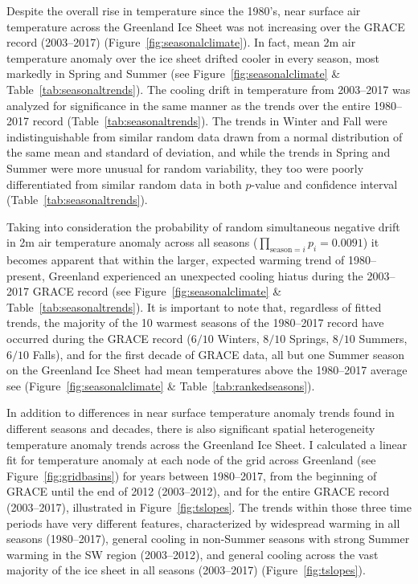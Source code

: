 \documentclass[11pt]{report}
\begin{document}


Despite the overall rise in temperature since the 1980's, near surface air temperature across the Greenland Ice Sheet was not increasing over the GRACE record (2003--2017) (Figure~\ref{fig:seasonalclimate}). In fact, mean 2m air temperature anomaly over the ice sheet drifted cooler in every season, most markedly in Spring and Summer (see Figure~\ref{fig:seasonalclimate} \& Table~\ref{tab:seasonaltrends}). The cooling drift in temperature from 2003--2017 was analyzed for significance in the same manner as the trends over the entire 1980--2017 record (Table~\ref{tab:seasonaltrends}). The trends in Winter and Fall were indistinguishable from similar random data drawn from a normal distribution of the same mean and standard of deviation, and while the trends in Spring and Summer were more unusual for random variability, they too were poorly differentiated from similar random data in both $p$-value and confidence interval (Table~\ref{tab:seasonaltrends}). 

Taking into consideration the probability of random simultaneous negative drift in 2m air temperature anomaly across all seasons ($\prod_{\mathrm{season}=i} p_i = 0.0091$) it becomes apparent that within the larger, expected warming trend of 1980--present, Greenland experienced an unexpected cooling hiatus during the 2003--2017 GRACE record (see Figure~\ref{fig:seasonalclimate} \& Table~\ref{tab:seasonaltrends}). It is important to note that, regardless of fitted trends, the majority of the 10 warmest seasons of the 1980--2017 record have occurred during the GRACE record ($6/10$ Winters, $8/10$ Springs, $8/10$ Summers, $6/10$ Falls), and for the first decade of GRACE data, all but one Summer season on the Greenland Ice Sheet had mean temperatures above the 1980--2017 average see (Figure~\ref{fig:seasonalclimate} \& Table~\ref{tab:rankedseasons}).

In addition to differences in near surface temperature anomaly trends found in different seasons and decades, there is also significant spatial heterogeneity temperature anomaly trends across the Greenland Ice Sheet. I calculated a linear fit for temperature anomaly at each node of the grid across Greenland (see Figure~\ref{fig:gridbasins}) for years between 1980--2017, from the beginning of GRACE until the end of 2012 (2003--2012), and for the entire GRACE record (2003--2017), illustrated in Figure~\ref{fig:tslopes}. The trends within those three time periods have very different features, characterized by widespread warming in all seasons (1980--2017), general cooling in non-Summer seasons with strong Summer warming in the SW region (2003--2012), and general cooling across the vast majority of the ice sheet in all seasons (2003--2017) (Figure~\ref{fig:tslopes}). 
\end{document}

